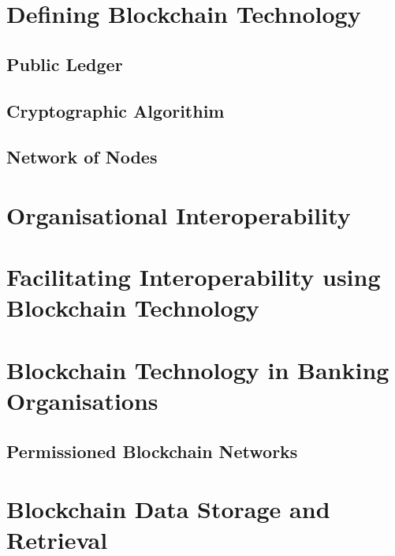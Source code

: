 \section{Defining Blockchain Technology}

\subsection{Public Ledger}

\subsection{Cryptographic Algorithim}

\subsection{Network of Nodes}

\section{Organisational Interoperability}

\section{Facilitating Interoperability using Blockchain Technology}

\section{Blockchain Technology in Banking Organisations}

\subsection{Permissioned Blockchain Networks}

\section{Blockchain Data Storage and Retrieval}